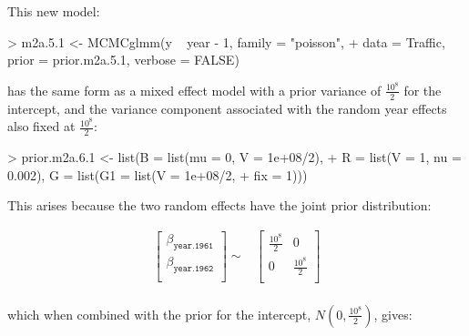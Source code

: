 \documentclass{article}
\begin{document}
This new model:

\begin{Schunk}
\begin{Sinput}
> m2a.5.1 <- MCMCglmm(y ~ year - 1, family = "poisson", 
+     data = Traffic, prior = prior.m2a.5.1, verbose = FALSE)
\end{Sinput}
\end{Schunk}

has the same form as a mixed effect model with a prior variance of $\frac{10^{8}}{2}$ for the intercept, and the variance component associated with the random year effects also fixed at $\frac{10^{8}}{2}$:

\begin{Schunk}
\begin{Sinput}
> prior.m2a.6.1 <- list(B = list(mu = 0, V = 1e+08/2), 
+     R = list(V = 1, nu = 0.002), G = list(G1 = list(V = 1e+08/2, 
+         fix = 1)))
\end{Sinput}
\end{Schunk}


This arises because the two random effects have the joint prior distribution:

\begin{equation}
\begin{array}{rl}
\left[
\begin{array}{c}
 \beta_{\texttt{year.1961}}\\
 \beta_{\texttt{year.1962}}\\
\end{array}
\right]
\sim
&
\left[
\begin{array}{cc}
\frac{10^{8}}{2}&0\\
0&\frac{10^{8}}{2}\\
\end{array}
\right]\\
\end{array}
\end{equation}

which when combined with the prior for the intercept, $N(0, \frac{10^{8}}{2})$, gives:
\end{document}
